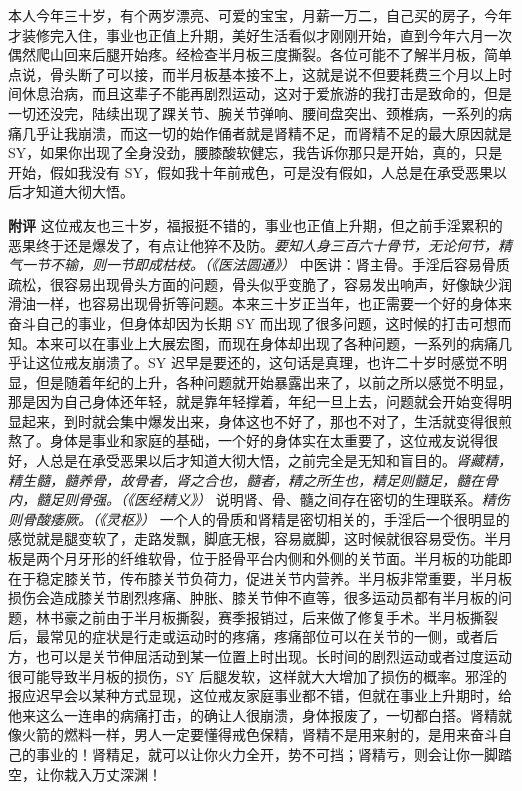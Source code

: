\begin{case}
    本人今年三十岁，有个两岁漂亮、可爱的宝宝，月薪一万二，自己买的房子，今年才装修完入住，事业也正值上升期，美好生活看似才刚刚开始，直到今年六月一次偶然爬山回来后腿开始疼。经检查半月板三度撕裂。各位可能不了解半月板，简单点说，骨头断了可以接，而半月板基本接不上，这就是说不但要耗费三个月以上时间休息治病，而且这辈子不能再剧烈运动，这对于爱旅游的我打击是致命的，但是一切还没完，陆续出现了踝关节、腕关节弹响、腰间盘突出、颈椎病，一系列的病痛几乎让我崩溃，而这一切的始作俑者就是肾精不足，而肾精不足的最大原因就是 SY，如果你出现了全身没劲，腰膝酸软健忘，我告诉你那只是开始，真的，只是开始，假如我没有 SY，假如我十年前戒色，可是没有假如，人总是在承受恶果以后才知道大彻大悟。

    \textbf{附评} 这位戒友也三十岁，福报挺不错的，事业也正值上升期，但之前手淫累积的恶果终于还是爆发了，有点让他猝不及防。\textit{要知人身三百六十骨节，无论何节，精气一节不输，则一节即成枯枝。（《医法圆通》）} 中医讲：肾主骨。手淫后容易骨质疏松，很容易出现骨头方面的问题，骨头似乎变脆了，容易发出响声，好像缺少润滑油一样，也容易出现骨折等问题。本来三十岁正当年，也正需要一个好的身体来奋斗自己的事业，但身体却因为长期 SY 而出现了很多问题，这时候的打击可想而知。本来可以在事业上大展宏图，而现在身体却出现了各种问题，一系列的病痛几乎让这位戒友崩溃了。SY 迟早是要还的，这句话是真理，也许二十岁时感觉不明显，但是随着年纪的上升，各种问题就开始暴露出来了，以前之所以感觉不明显，那是因为自己身体还年轻，就是靠年轻撑着，年纪一旦上去，问题就会开始变得明显起来，到时就会集中爆发出来，身体这也不好了，那也不对了，生活就变得很煎熬了。身体是事业和家庭的基础，一个好的身体实在太重要了，这位戒友说得很好，人总是在承受恶果以后才知道大彻大悟，之前完全是无知和盲目的。\textit{肾藏精，精生髓，髓养骨，故骨者，肾之合也，髓者，精之所生也，精足则髓足，髓在骨内，髓足则骨强。（《医经精义》）} 说明肾、骨、髓之间存在密切的生理联系。\textit{精伤则骨酸痿厥。（《灵枢》）} 一个人的骨质和肾精是密切相关的，手淫后一个很明显的感觉就是腿变软了，走路发飘，脚底无根，容易崴脚，这时候就很容易受伤。半月板是两个月牙形的纤维软骨，位于胫骨平台内侧和外侧的关节面。半月板的功能即在于稳定膝关节，传布膝关节负荷力，促进关节内营养。半月板非常重要，半月板损伤会造成膝关节剧烈疼痛、肿胀、膝关节伸不直等，很多运动员都有半月板的问题，林书豪之前由于半月板撕裂，赛季报销过，后来做了修复手术。半月板撕裂后，最常见的症状是行走或运动时的疼痛，疼痛部位可以在关节的一侧，或者后方，也可以是关节伸屈活动到某一位置上时出现。长时间的剧烈运动或者过度运动很可能导致半月板的损伤，SY 后腿发软，这样就大大增加了损伤的概率。邪淫的报应迟早会以某种方式显现，这位戒友家庭事业都不错，但就在事业上升期时，给他来这么一连串的病痛打击，的确让人很崩溃，身体报废了，一切都白搭。肾精就像火箭的燃料一样，男人一定要懂得戒色保精，肾精不是用来射的，是用来奋斗自己的事业的！肾精足，就可以让你火力全开，势不可挡；肾精亏，则会让你一脚踏空，让你栽入万丈深渊！
\end{case}

